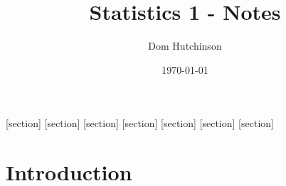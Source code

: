 \documentclass[11pt,a4paper]{article}
\begin{document}
\pagestyle{fancy}
\setlength\parindent{0pt}
\allowdisplaybreaks

\renewcommand{\headrulewidth}{0pt}

\title{Statistics 1 - Notes}
\author{Dom Hutchinson}
\date{\today}
\maketitle

\fancyhead[R]{\today}

[section]
[section]
[section]
[section]
[section]
[section]
[section]

\newcommand{\dotprod}[0]{\boldsymbol{\cdot}}
\newcommand{\cosech}[0]{\mathrm{cosech}\ }
\newcommand{\cosec}[0]{\mathrm{cosec}\ }
\newcommand{\sech}[0]{\mathrm{sech}\ }
\newcommand{\nats}[0]{\mathbb{N}}
\newcommand{\prob}[0]{\mathbb{P}}
\newcommand{\expect}[0]{\mathbb{E}}
\newcommand{\real}[0]{\mathbb{R}}
\newcommand{\nb}[0]{N.B. }

\newcommand{\definition}[1]{\stepcounter{definition} \textbf{Definition \arabic{section}.\arabic{definition}\ - }\textit{#1}\\}
\newcommand{\example}[1]{\stepcounter{example} \textbf{Example \arabic{section}.\arabic{example}\ - }\textit{#1}\\}
\newcommand{\notation}[1]{\stepcounter{notation} \textbf{Notation \arabic{section}.\arabic{notation}\ - }\textit{#1}\\}
\newcommand{\proof}[1]{\stepcounter{proof} \textbf{Proof \arabic{section}.\arabic{proof}\ - }\textit{#1}\\}
\newcommand{\proposition}[1]{\stepcounter{proposition} \textbf{Proposition \arabic{section}.\arabic{proposition}\ - }\textit{#1}\\}
\newcommand{\remark}[1]{\stepcounter{remark} \textbf{Remark \arabic{section}.\arabic{remark}\ - }\textit{#1}\\}
\newcommand{\theorem}[1]{\stepcounter{theorem} \textbf{Theorem \arabic{section}.\arabic{theorem}\ - }\textit{#1}\\}

\tableofcontents

\newpage

\section{Introduction}
\end{document}
